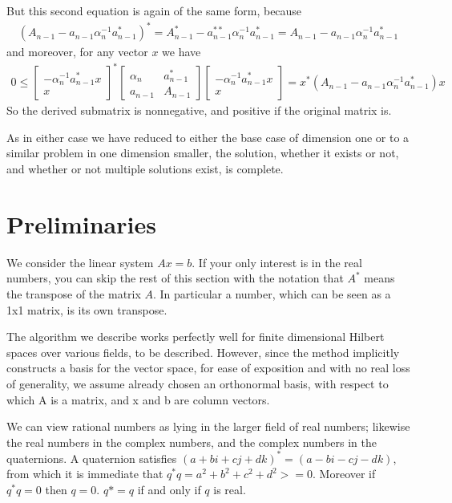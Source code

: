 \documentclass{article}
\begin{document}
But this second equation is again of the same form, because
\begin{gather}{}(A_{n-1} - a_{n-1}\alpha_n^{-1}a_{n-1}^*)^* = 
A_{n-1}^{*} - a_{n-1}^{**}\alpha_n^{-1}a_{n-1}^* = 
A_{n-1} - a_{n-1}\alpha_n^{-1}a_{n-1}^* 
\end{gather}
and moreover, for any vector $x$ we have
\begin{gather}{}
0 \leq \begin{bmatrix}-\alpha_n^{-1}a_{n-1}^*x\\x\end{bmatrix}^*\begin{bmatrix}\alpha_n & a_{n-1}^* \\ a_{n-1} & A_{n-1}\end{bmatrix}\begin{bmatrix}-\alpha_n^{-1}a_{n-1}^*x\\x\end{bmatrix}
= 
x^*(A_{n-1} - a_{n-1}\alpha_n^{-1}a_{n-1}^*)x
\end{gather} So the derived submatrix is nonnegative, and positive if the original matrix is.

As in either case we have reduced to either the base case of dimension one or to a similar problem in one dimension smaller, the solution, whether it exists or
not, and whether or not multiple solutions exist, is complete.

\section{Preliminaries}

We consider the linear system $Ax=b$. If your only interest is in the real numbers,
you can skip the rest of this section with the notation that $A^*$ means the transpose of the matrix $A$. In particular a number, which can be seen as a 1x1 matrix, is its own transpose.

The algorithm we describe works perfectly well for finite dimensional Hilbert spaces over various fields, to be described. However, since the method implicitly constructs a basis for the vector space, for ease of exposition and with no real loss of generality, we assume already chosen an orthonormal basis, with respect to which A is a matrix, and x and b are column vectors.

We can view rational numbers as lying in the larger field of real numbers; likewise the real numbers in the complex numbers, and the complex numbers in the quaternions. A quaternion satisfies $(a + bi +cj + dk)^* = (a -bi -cj -dk)$, from which it is immediate that $q^*q = a^2 + b^2 + c^2 + d^2 >= 0$. Moreover if $q^*q =0$ then $q =0$.
$q* = q$ if and only if $q$ is real.
\end{document}

